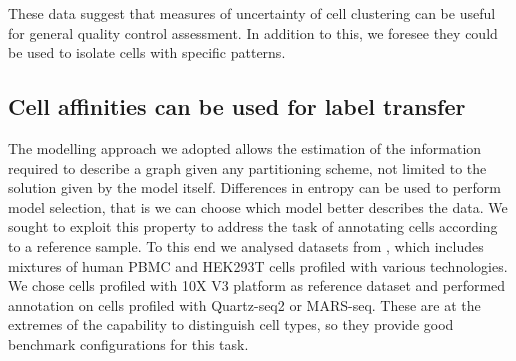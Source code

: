 \documentclass[10pt]{article}
\begin{document}
These data suggest that measures of uncertainty of cell clustering can be useful for general quality control assessment. In addition to this, we foresee they could be used to isolate cells with specific patterns.



\subsection*{Cell affinities can be used for label transfer}

The modelling approach we adopted allows the estimation of the information required to describe a graph given any partitioning scheme, not limited to the solution given by the model itself. Differences in entropy can be used to perform model selection, that is we can choose which model better describes the data. We sought to exploit this property to address the task of annotating cells according to a reference sample. To this end we analysed datasets from \cite{mereu_2020}, which includes mixtures of human PBMC and HEK293T cells profiled with various technologies. We chose cells profiled with 10X V3 platform as reference dataset and performed annotation on cells profiled with Quartz-seq2 or MARS-seq. These are at the extremes of the capability to distinguish cell types, so they provide good benchmark configurations for this task. 
\end{document}
